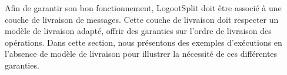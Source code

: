 \label{sec:logootsplit-delivery-model}

Afin de garantir son bon fonctionnement, LogootSplit doit être associé à une couche de livraison de messages.
Cette couche de livraison doit respecter un modèle de livraison adapté, \ie offrir des garanties sur l'ordre de livraison des opérations.
Dans cette section, nous présentons des exemples d'exécutions en l'absence de modèle de livraison pour illustrer la nécessité de ces différentes garanties.
